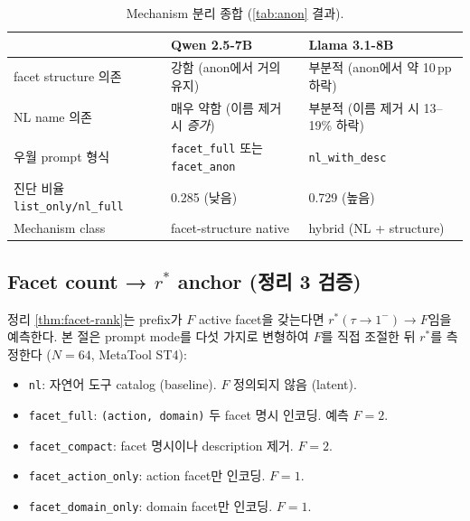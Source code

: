 \documentclass[11pt]{article}
\theoremstyle{definition}
\begin{document}
\begin{table}[h]
\centering
\caption{Mechanism 분리 종합 (\cref{tab:anon} 결과).}
\label{tab:mechanism}
\small
\begin{tabular}{lll}
\toprule
& Qwen 2.5-7B & Llama 3.1-8B \\
\midrule
facet structure 의존 & 강함 (anon에서 거의 유지) & 부분적 (anon에서 약 10\,pp 하락) \\
NL name 의존         & 매우 약함 (이름 제거 시 \emph{증가}) & 부분적 (이름 제거 시 13--19\% 하락) \\
우월 prompt 형식      & \texttt{facet\_full} 또는 \texttt{facet\_anon} & \texttt{nl\_with\_desc} \\
진단 비율 \texttt{list\_only/nl\_full} & 0.285 (낮음) & 0.729 (높음) \\
Mechanism class       & facet-structure native & hybrid (NL + structure) \\
\bottomrule
\end{tabular}
\end{table}

\subsection{Facet count → $r^*$ anchor (정리 3 검증)}
\label{sec:exp-facet-rank}

정리 \ref{thm:facet-rank}는 prefix가 $F$ active facet을 갖는다면 $r^*(\tau \to 1^-) \to F$임을 예측한다. 본 절은 prompt mode를 다섯 가지로 변형하여 $F$를 직접 조절한 뒤 $r^*$를 측정한다 ($N=64$, MetaTool ST4):

\begin{itemize}[leftmargin=*]
\item \texttt{nl}: 자연어 도구 catalog (baseline). $F$ 정의되지 않음 (latent).
\item \texttt{facet\_full}: \texttt{(action, domain)} 두 facet 명시 인코딩. 예측 $F = 2$.
\item \texttt{facet\_compact}: facet 명시이나 description 제거. $F = 2$.
\item \texttt{facet\_action\_only}: action facet만 인코딩. $F = 1$.
\item \texttt{facet\_domain\_only}: domain facet만 인코딩. $F = 1$.
\end{itemize}
\end{document}
